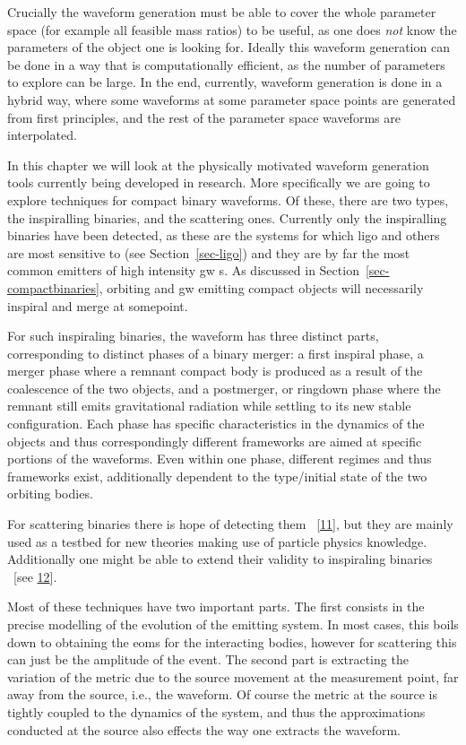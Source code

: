\documentclass[
  10pt,
  a4paper,
  DIV=11,
  numbers=noendperiod,
  twoside]{scrreprt}
\DeclareRobustCommand{\[}{\begin{equation}}
\DeclareRobustCommand{\]}{\end{equation}}
\begin{document}
Crucially the waveform generation must be able to cover the whole
parameter space (for example all feasible mass ratios) to be useful, as
one does \emph{not} know the parameters of the object one is looking
for. Ideally this waveform generation can be done in a way that is
computationally efficient, as the number of parameters to explore can be
large. In the end, currently, waveform generation is done in a hybrid
way, where some waveforms at some parameter space points are generated
from first principles, and the rest of the parameter space waveforms are
interpolated.

In this chapter we will look at the physically motivated waveform
generation tools currently being developed in research. More
specifically we are going to explore techniques for compact binary
waveforms. Of these, there are two types, the inspiralling binaries, and
the scattering ones. Currently only the inspiralling binaries have been
detected, as these are the systems for which \gls{ligo} and others are
most sensitive to (see Section~\ref{sec-ligo}) and they are by far the
most common emitters of high intensity \gls{gw} s. As discussed in
Section~\ref{sec-compactbinaries}, orbiting and \gls{gw} emitting
compact objects will necessarily inspiral and merge at somepoint.

For such inspiraling binaries, the waveform has three distinct parts,
corresponding to distinct phases of a binary merger: a first inspiral
phase, a merger phase where a remnant compact body is produced as a
result of the coalescence of the two objects, and a postmerger, or
ringdown phase where the remnant still emits gravitational radiation
while settling to its new stable configuration. Each phase has specific
characteristics in the dynamics of the objects and thus correspondingly
different frameworks are aimed at specific portions of the waveforms.
Even within one phase, different regimes and thus frameworks exist,
additionally dependent to the type/initial state of the two orbiting
bodies.

For scattering binaries there is hope of detecting them
~{[}\protect\hyperlink{ref-Mukherjee:2020hnm}{11}{]}, but they are
mainly used as a testbed for new theories making use of particle physics
knowledge. Additionally one might be able to extend their validity to
inspiraling binaries ~{[}see
\protect\hyperlink{ref-Kalin:2019rwq}{12}{]}.

Most of these techniques have two important parts. The first consists in
the precise modelling of the evolution of the emitting system. In most
cases, this boils down to obtaining the \glspl{eom} for the interacting
bodies, however for scattering this can just be the amplitude of the
event. The second part is extracting the variation of the metric due to
the source movement at the measurement point, far away from the source,
i.e., the waveform. Of course the metric at the source is tightly
coupled to the dynamics of the system, and thus the approximations
conducted at the source also effects the way one extracts the waveform.
\end{document}
